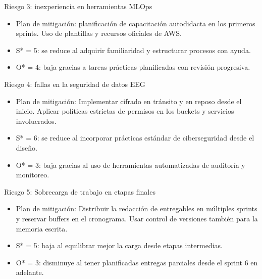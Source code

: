 \documentclass[
11pt, %
]{charter}
\begin{document}
Riesgo 3: inexperiencia en herramientas MLOps
\begin{itemize}
  \item Plan de mitigación: planificación de capacitación autodidacta en los primeros sprints. Uso de plantillas y recursos oficiales de AWS.
  \item S* = 5: se reduce al adquirir familiaridad y estructurar procesos con ayuda.
  \item O* = 4:  baja gracias a tareas prácticas planificadas con revisión progresiva.
\end{itemize}

Riesgo 4: fallas en la seguridad de datos EEG
\begin{itemize}
  \item Plan de mitigación: Implementar cifrado en tránsito y en reposo desde el inicio. Aplicar políticas estrictas de permisos en los buckets y servicios involucrados.
  \item S* = 6: se reduce al incorporar prácticas estándar de ciberseguridad desde el diseño.
  \item O* = 3: baja gracias al uso de herramientas automatizadas de auditoría y monitoreo.
\end{itemize}

Riesgo 5: Sobrecarga de trabajo en etapas finales
\begin{itemize}
  \item Plan de mitigación: Distribuir la redacción de entregables en múltiples sprints y reservar buffers en el cronograma. Usar control de versiones también para la memoria escrita.
  \item S* = 5: baja al equilibrar mejor la carga desde etapas intermedias.
  \item O* = 3: disminuye al tener planificadas entregas parciales desde el sprint 6 en adelante.
\end{itemize}
\vspace{6.3cm}
\end{document}
